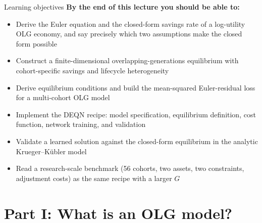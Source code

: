 \documentclass[aspectratio=169,11pt]{beamer}
\begin{document}
\begin{frame}{Learning objectives}
\textbf{By the end of this lecture you should be able to:}
\begin{itemize}
  \item Derive the Euler equation and the closed-form savings rate of a log-utility OLG economy, and say precisely which two assumptions make the closed form possible
  \item Construct a finite-dimensional overlapping-generations equilibrium with cohort-specific savings and lifecycle heterogeneity
  \item Derive equilibrium conditions and build the mean-squared Euler-residual loss for a multi-cohort OLG model
  \item Implement the DEQN recipe: model specification, equilibrium definition, cost function, network training, and validation
  \item Validate a learned solution against the closed-form equilibrium in the analytic Krueger--K\"ubler model
  \item Read a research-scale benchmark (56 cohorts, two assets, two constraints, adjustment costs) as the same recipe with a larger $G$
\end{itemize}
\end{frame}




\section{Part I: What is an OLG model?}
\end{document}

